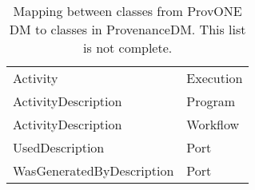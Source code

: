 \begin{table}[ht]
\centering
\small
{}\textwidth
\begin{tabulary}{1.0\textwidth}{LL}
\toprule
{} &  \\
\midrule
Activity               & Execution       \\
ActivityDescription    & Program          \\
ActivityDescription    & Workflow         \\
UsedDescription           & Port         \\
WasGeneratedByDescription & Port         \\
\bottomrule
\end{tabulary}
\caption[Mapping between classes from ProvONE DM to classes in ProvenanceDM]{Mapping between classes from ProvONE DM to classes in ProvenanceDM. This list is not complete.}
\label{tab:provonemapping}
\end{table}

